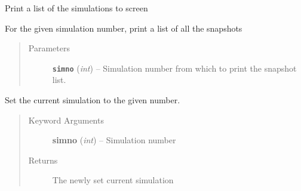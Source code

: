 \documentclass[letterpaper,10pt,english]{sphinxmanual}
\begin{document}

\begin{fulllineitems}
\label{index:facade.sims}
Print a list of the simulations to screen

\end{fulllineitems}


\begin{fulllineitems}
\label{index:facade.snaps}
For the given simulation number, print a list of all the snapshots
\begin{quote}\begin{description}
\item[{Parameters}] \leavevmode
\textbf{\texttt{simno}} (\emph{int}) -- Simulation number from which to print the snapshot list.

\end{description}\end{quote}

\end{fulllineitems}


\begin{fulllineitems}
\label{index:facade.set_current_sim}
Set the current simulation to the given number.
\begin{quote}\begin{description}
\item[{Keyword Arguments}] \leavevmode
\textbf{simno} (\emph{int}) --
Simulation number

\item[{Returns}] \leavevmode
The newly set current simulation

\end{description}\end{quote}

\end{fulllineitems}

\end{document}
